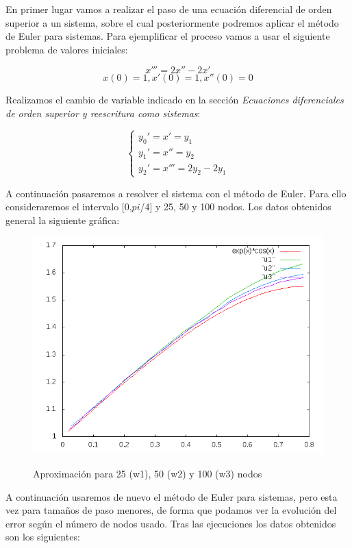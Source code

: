 \documentclass[12pt]{article}       %
\begin{document}
En primer lugar vamos a realizar el paso de una ecuación diferencial de orden superior a un sistema, sobre el cual posteriormente podremos aplicar el método de Euler para sistemas. Para ejemplificar el proceso vamos a usar el siguiente problema de valores iniciales: 

$$
x''' = 2x'' - 2x'     %
$$
$$
x(0)=1, x'(0)=1, x''(0)=0
$$

Realizamos el cambio de variable indicado en la sección \textit{Ecuaciones diferenciales de orden superior y reescritura como sistemas}:

$$
\begin{cases}
y_0' = x' = y_1\\
y_1' = x'' = y_2\\
y_2' = x''' = 2y_2 - 2y_1
\end{cases}
$$

A continuación pasaremos a resolver el sistema con el método de Euler. Para ello consideraremos el intervalo [0,$pi$/4] y 25, 50 y 100 nodos. Los datos obtenidos general la siguiente gráfica: 

\begin{figure}[H]
\centering
\includegraphics[scale=0.65]{img/graphic.png}
\label{figura1}
\caption{Aproximación para 25 (w1), 50 (w2) y 100 (w3) nodos} 
\end{figure}

A continuación usaremos de nuevo el método de Euler para sistemas, pero esta vez para tamaños de paso menores, de forma que podamos ver la evolución del error según el número de nodos usado. Tras las ejecuciones los datos obtenidos son los siguientes:
\end{document}
